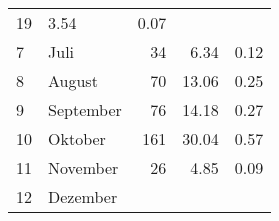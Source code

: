 \begin{longtable}{lXrrr}
       \num{19} &
       \num[round-mode=places,round-precision=2]{3.54} &
         \num[round-mode=places,round-precision=2]{0.07} \\

     7 &
     \multicolumn{1}{X}{ Juli   } &


       \num{34} &
       \num[round-mode=places,round-precision=2]{6.34} &
         \num[round-mode=places,round-precision=2]{0.12} \\

     8 &
     \multicolumn{1}{X}{ August   } &


       \num{70} &
       \num[round-mode=places,round-precision=2]{13.06} &
         \num[round-mode=places,round-precision=2]{0.25} \\

     9 &
     \multicolumn{1}{X}{ September   } &


       \num{76} &
       \num[round-mode=places,round-precision=2]{14.18} &
         \num[round-mode=places,round-precision=2]{0.27} \\

     10 &
     \multicolumn{1}{X}{ Oktober   } &


       \num{161} &
       \num[round-mode=places,round-precision=2]{30.04} &
         \num[round-mode=places,round-precision=2]{0.57} \\

     11 &
     \multicolumn{1}{X}{ November   } &


       \num{26} &
       \num[round-mode=places,round-precision=2]{4.85} &
         \num[round-mode=places,round-precision=2]{0.09} \\

     12 &
     \multicolumn{1}{X}{ Dezember   } &



\end{longtable}
